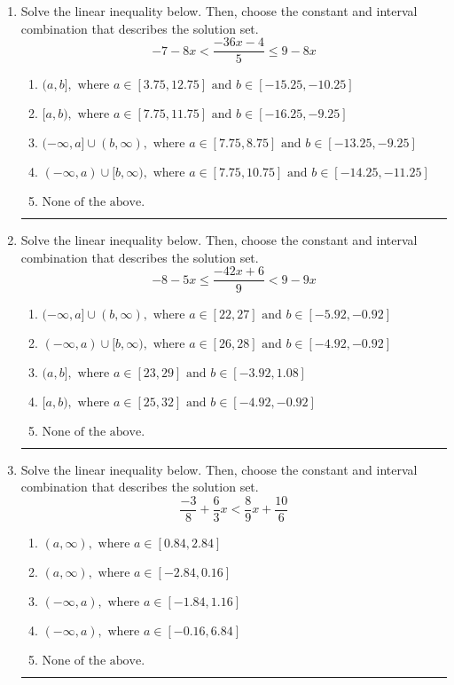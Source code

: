 \documentclass[14pt]{extbook}
\newcommand{\litem}[1]{\item#1\hspace*{-1cm}\rule{\textwidth}{0.4pt}}
\begin{document}
\begin{enumerate}
{\begin{enumerate}[label=\Alph*.]
\end{enumerate} }
\litem{
Solve the linear inequality below. Then, choose the constant and interval combination that describes the solution set.\[ -7 - 8 x < \frac{-36 x - 4}{5} \leq 9 - 8 x \]\begin{enumerate}[label=\Alph*.]
\item \( (a, b], \text{ where } a \in [3.75, 12.75] \text{ and } b \in [-15.25, -10.25] \)
\item \( [a, b), \text{ where } a \in [7.75, 11.75] \text{ and } b \in [-16.25, -9.25] \)
\item \( (-\infty, a] \cup (b, \infty), \text{ where } a \in [7.75, 8.75] \text{ and } b \in [-13.25, -9.25] \)
\item \( (-\infty, a) \cup [b, \infty), \text{ where } a \in [7.75, 10.75] \text{ and } b \in [-14.25, -11.25] \)
\item \( \text{None of the above.} \)

\end{enumerate} }
\litem{
Solve the linear inequality below. Then, choose the constant and interval combination that describes the solution set.\[ -8 - 5 x \leq \frac{-42 x + 6}{9} < 9 - 9 x \]\begin{enumerate}[label=\Alph*.]
\item \( (-\infty, a] \cup (b, \infty), \text{ where } a \in [22, 27] \text{ and } b \in [-5.92, -0.92] \)
\item \( (-\infty, a) \cup [b, \infty), \text{ where } a \in [26, 28] \text{ and } b \in [-4.92, -0.92] \)
\item \( (a, b], \text{ where } a \in [23, 29] \text{ and } b \in [-3.92, 1.08] \)
\item \( [a, b), \text{ where } a \in [25, 32] \text{ and } b \in [-4.92, -0.92] \)
\item \( \text{None of the above.} \)

\end{enumerate} }
\litem{
Solve the linear inequality below. Then, choose the constant and interval combination that describes the solution set.\[ \frac{-3}{8} + \frac{6}{3} x < \frac{8}{9} x + \frac{10}{6} \]\begin{enumerate}[label=\Alph*.]
\item \( (a, \infty), \text{ where } a \in [0.84, 2.84] \)
\item \( (a, \infty), \text{ where } a \in [-2.84, 0.16] \)
\item \( (-\infty, a), \text{ where } a \in [-1.84, 1.16] \)
\item \( (-\infty, a), \text{ where } a \in [-0.16, 6.84] \)
\item \( \text{None of the above}. \)


\end{enumerate}}
\end{enumerate}
\end{document}
